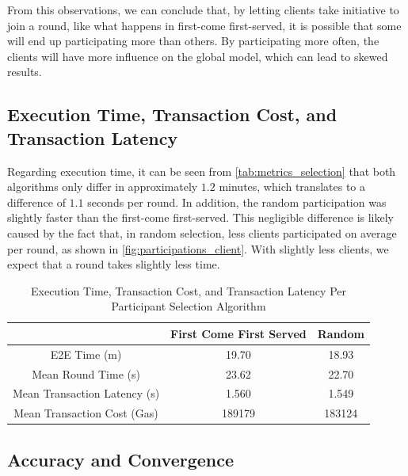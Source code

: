 From this observations, we can conclude that, by letting clients take initiative to join a round, like what happens in first-come first-served, it is possible that some will end up participating more than others. By participating more often, the clients will have more influence on the global model, which can lead to skewed results.

\subsection{Execution Time, Transaction Cost, and Transaction Latency}

Regarding execution time, it can be seen from  \autoref{tab:metrics_selection} that both algorithms only differ in approximately $1.2$ minutes, which translates to a difference of $1.1$ seconds per round. In addition, the random participation was slightly faster than the first-come first-served. This negligible difference is likely caused by the fact that, in random selection, less clients participated on average per round, as shown in \autoref{fig:participations_client}. With slightly less clients, we expect that a round takes slightly less time.

\begin{table}[!ht]
\begin{tabular}{c|c|c} \hline \hline
                              & First Come First Served & Random \\ \hline \hline
E2E Time (m)                   & 19.70                   & 18.93  \\ \hline
Mean Round Time (s)            & 23.62                   & 22.70  \\ \hline
Mean Transaction Latency (s)   & 1.560                   & 1.549  \\ \hline
Mean Transaction Cost (Gas)    & 189179                  & 183124 \\ \hline
\end{tabular}
\caption{Execution Time, Transaction Cost, and Transaction Latency Per Participant Selection Algorithm}
\label{tab:metrics_selection}
\end{table}

\subsection{Accuracy and Convergence}

